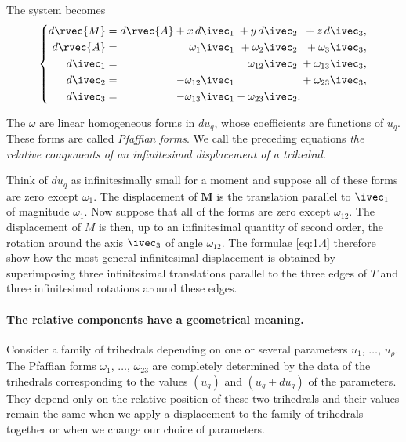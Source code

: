 The system becomes
\begin{equation}
  \label{eq:1.4}
  \left\{
    \begin{alignedat}{6}
      d{\rvec{M}}&=d{\rvec{A}}&{}+x\,d\ivec_{1}&&{}+y\,d\ivec_{2}&&{}+z\,d\ivec_{3},\\
      d{\rvec{A}}&=&\omega_{1}\ivec_{1}&&{}+\omega_{2}\ivec_{2}&&{}+\omega_{3}\ivec_{3},\\
      d\ivec_{1}&=&&&{}\omega_{12}\ivec_{2}&&{}+\omega_{13}\ivec_{3},\\
      d\ivec_{2}&=&-\omega_{12}\ivec_{1}&&&&{}+\omega_{23}\ivec_{3},\\
      d\ivec_{3}&=&-\omega_{13}\ivec_{1}&&{}-\omega_{23}\ivec_{2}&.&
    \end{alignedat}
  \right.
\end{equation}

The $\omega$ are linear homogeneous forms in $du_{q}$, whose coefficients are functions of $u_{q}$. These forms are called \emph{Pfaffian forms}.  We call the preceding equations \emph{the relative components of an infinitesimal displacement of a trihedral.}

Think of $du_{q}$ as infinitesimally small for a moment and suppose all of these forms are zero except $\omega_{1}$. The displacement of $\textbf{M}$ is the translation parallel to $\ivec_{1}$ of magnitude $\omega_{1}$. Now suppose that all of the forms are zero except $\omega_{12}$. The displacement of $M$ is then, up to an infinitesimal quantity of second order, the rotation around the axis $\ivec_{3}$ of angle $\omega_{12}$. The formulae \eqref{eq:1.4} therefore show how the most general infinitesimal displacement is obtained by superimposing three infinitesimal translations parallel to the three edges of $T$ and three infinitesimal rotations around these edges.

\paragraph{The relative components have a geometrical meaning.}
\label{sec:4}
Consider a family of trihedrals depending on one or several parameters $u_{1}$, $\dots$, $u_{\rho}$. The Pfaffian forms $\omega_{1}$, $\dots$, $\omega_{23}$ are completely determined by the data of the trihedrals corresponding to the values $(u_{q})$ and $(u_{q}+du_{q})$ of the parameters. They depend only on the relative position of these two trihedrals and their values remain the same when we apply a displacement to the family of trihedrals together or when we change our choice of parameters.

